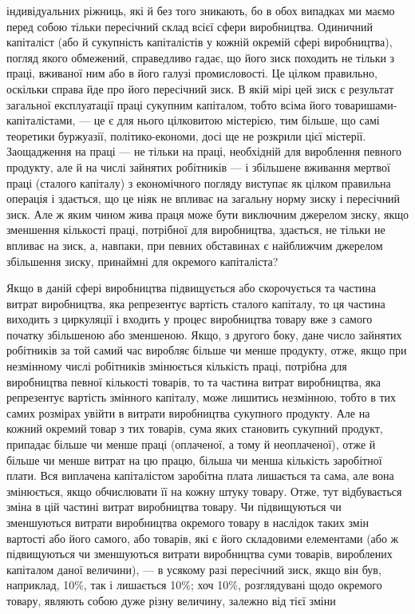 індивідуальних ріжниць, які й без того зникають, бо в обох
випадках ми маємо перед собою тільки пересічний склад всієї
сфери виробництва. Одиничний капіталіст (або й сукупність капіталістів у кожній окремій сфері
виробництва), погляд якого
обмежений, справедливо гадає, що його зиск походить не тільки
з праці, вживаної ним або в його галузі промисловості. Це цілком правильно, оскільки справа йде про
його пересічний зиск.
В якій мірі цей зиск є результат загальної експлуатації праці
сукупним капіталом, тобто всіма його товаришами-капіталістами, — це є для нього цілковитою
містерією, тим більше, що самі теоретики буржуазії, політико-економи, досі ще не розкрили цієї
містерії. Заощадження на праці — не тільки на праці, необхідній
для вироблення певного продукту, але й на числі зайнятих робітників — і збільшене вживання мертвої
праці (сталого капіталу)
з економічного погляду виступає як цілком правильна операція і здається, що це ніяк не впливає на
загальну норму
зиску і пересічний зиск. Але ж яким чином жива праця може
бути виключним джерелом зиску, якщо зменшення кількості
праці, потрібної для виробництва, здається, не тільки не впливає на зиск, а, навпаки, при певних
обставинах є найближчим
джерелом збільшення зиску, принаймні для окремого капіталіста?

Якщо в даній сфері виробництва підвищується або скорочується та частина витрат виробництва, яка
репрезентує вартість
сталого капіталу, то ця частина виходить з циркуляції і входить
у процес виробництва товару вже з самого початку збільшеною або зменшеною. Якщо, з другого боку,
дане число зайнятих робітників за той самий час виробляє більше чи менше продукту, отже, якщо при
незмінному числі робітників змінюється кількість праці, потрібна для виробництва певної кількості
товарів, то та частина витрат виробництва, яка репрезентує вартість змінного капіталу, може лишитись
незмінною,
тобто в тих самих розмірах увійти в витрати виробництва сукупного продукту. Але на кожний окремий
товар з тих товарів, сума яких становить сукупний продукт, припадає більше чи менше праці
(оплаченої, а тому й неоплаченої), отже й більше
чи менше витрат на цю працю, більша чи менша кількість заробітної плати. Вся виплачена капіталістом
заробітна плата лишається та сама, але вона змінюється, якщо обчислювати її на кожну штуку товару.
Отже, тут відбувається зміна в цій частині
витрат виробництва товару. Чи підвищуються чи зменшуються витрати виробництва окремого товару в
наслідок таких змін вартості
або його самого, або товарів, які є його складовими елементами
(або ж підвищуються чи зменшуються витрати виробництва суми
товарів, вироблених капіталом даної величини), — в усякому
разі пересічний зиск, якщо він був, наприклад, 10\%, так і лишається 10\%; хоч 10\%, розглядувані щодо
окремого товару,
являють собою дуже різну величину, залежно від тієї зміни
